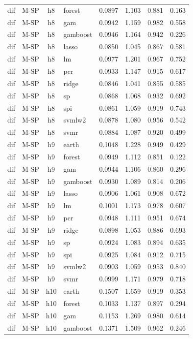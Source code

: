 \begin{ThreePartTable}
\begin{longtable}[t]{llclcccc}
dif & M-SP & h8 & forest & 0.0897 & 1.103 & 0.881 & 0.163\\
dif & M-SP & h8 & gam & 0.0942 & 1.159 & 0.982 & 0.558\\
dif & M-SP & h8 & gamboost & 0.0946 & 1.164 & 0.942 & 0.226\\
dif & M-SP & h8 & lasso & 0.0850 & 1.045 & 0.867 & 0.581\\
dif & M-SP & h8 & lm & 0.0977 & 1.201 & 0.967 & 0.752\\
dif & M-SP & h8 & pcr & 0.0933 & 1.147 & 0.915 & 0.617\\
dif & M-SP & h8 & ridge & 0.0846 & 1.041 & 0.855 & 0.585\\
dif & M-SP & h8 & sp & 0.0868 & 1.068 & 0.932 & 0.692\\
dif & M-SP & h8 & spi & 0.0861 & 1.059 & 0.919 & 0.743\\
dif & M-SP & h8 & svmlw2 & 0.0878 & 1.080 & 0.956 & 0.542\\
dif & M-SP & h8 & svmr & 0.0884 & 1.087 & 0.920 & 0.499\\
\addlinespace
dif & M-SP & h9 & earth & 0.1048 & 1.228 & 0.949 & 0.429\\
dif & M-SP & h9 & forest & 0.0949 & 1.112 & 0.851 & 0.122\\
dif & M-SP & h9 & gam & 0.0944 & 1.106 & 0.860 & 0.296\\
dif & M-SP & h9 & gamboost & 0.0930 & 1.089 & 0.814 & 0.206\\
dif & M-SP & h9 & lasso & 0.0906 & 1.061 & 0.908 & 0.672\\
dif & M-SP & h9 & lm & 0.1001 & 1.173 & 0.978 & 0.607\\
dif & M-SP & h9 & pcr & 0.0948 & 1.111 & 0.951 & 0.674\\
dif & M-SP & h9 & ridge & 0.0898 & 1.053 & 0.886 & 0.693\\
dif & M-SP & h9 & sp & 0.0924 & 1.083 & 0.894 & 0.635\\
dif & M-SP & h9 & spi & 0.0925 & 1.084 & 0.912 & 0.715\\
dif & M-SP & h9 & svmlw2 & 0.0903 & 1.059 & 0.953 & 0.840\\
dif & M-SP & h9 & svmr & 0.0999 & 1.171 & 0.979 & 0.718\\
\addlinespace
dif & M-SP & h10 & earth & 0.1507 & 1.659 & 0.919 & 0.353\\
dif & M-SP & h10 & forest & 0.1033 & 1.137 & 0.897 & 0.294\\
dif & M-SP & h10 & gam & 0.1153 & 1.269 & 0.980 & 0.614\\
dif & M-SP & h10 & gamboost & 0.1371 & 1.509 & 0.962 & 0.246\\

\end{longtable}
\end{ThreePartTable}
